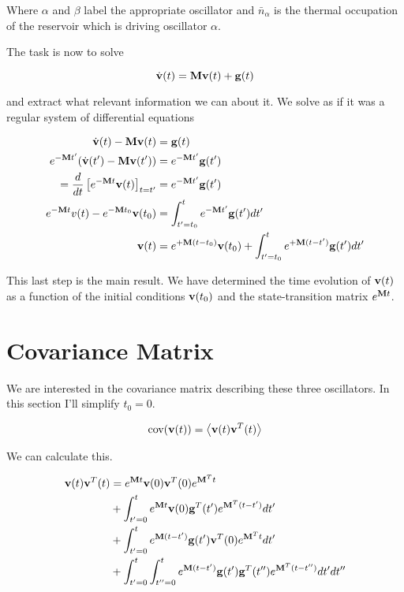 \documentclass[12pt]{article}
\newcommand{\bv}[1]{\bold{#1}}
\begin{document}
Where $\alpha$ and $\beta$ label the appropriate oscillator and $\bar{n}_{\alpha}$ is the thermal occupation of the reservoir which is driving oscillator $\alpha$.

The task is now to solve

\begin{equation}
\dot{\bv{v}}(t) = \bv{M} \bv{v}(t) + \bv{g}(t)
\label{main}
\end{equation}

and extract what relevant information we can about it. 
We solve as if it was a regular system of differential equations

\begin{align}
\dot{\bv{v}}(t) - \bv{M}\bv{v}(t) &= \bv{g}(t)\\
e^{-\bv{M} t'}(\dot{\bv{v}}(t') - \bv{M}\bv{v}(t')) &= e^{-\bv{M}t'} \bv{g}(t')\\
= \frac{d}{dt}\left[e^{-\bv{M}t}\bv{v}(t)\right]_{t=t'} &= e^{-\bv{M}t'}\bv{g}(t')\\
e^{-\bv{M}t}v(t) - e^{-\bv{M}t_0}\bv{v}(t_0) &= \int_{t'=t_0}^{t} e^{-\bv{M}t'}\bv{g}(t') dt'\\
\bv{v}(t) &= e^{+\bv{M}(t-t_0)}\bv{v}(t_0) + \int_{t'=t_0}^{t} e^{+\bv{M}(t-t')}\bv{g}(t')dt'
\end{align}


This last step is the main result. We have determined the time evolution of $\bv{v}(t)$ as a function of the initial conditions $\bv{v}(t_0)$ and the state-transition matrix $e^{\bv{M}t}$.

\section{Covariance Matrix}

We are interested in the covariance matrix describing these three oscillators. In this section I'll simplify $t_0 = 0$.

\[
\text{cov}(\bv{v}(t)) = \Braket{\bv{v}(t)\bv{v}^T(t)}
\]

We can calculate this.

\begin{align}
\bv{v}(t)\bv{v}^T(t) &= e^{\bv{M}t}\bv{v}(0)\bv{v}^T(0) e^{\bv{M}^T t}\\
&+\int_{t'=0}^{t}e^{\bv{M}t}\bv{v}(0) \bv{g}^T(t')e^{\bv{M}^T (t-t')}dt'\\
&+\int_{t'=0}^{t}e^{\bv{M}(t-t')}\bv{g}(t')\bv{v}^T(0)e^{\bv{M}^T t}dt'\\
&+ \int_{t'=0}^{t} \int_{t''=0}^{t} e^{\bv{M}(t-t')}\bv{g}(t')\bv{g}^T(t'')e^{\bv{M}^T (t-t'')} dt' dt''
\end{align}
\end{document}
